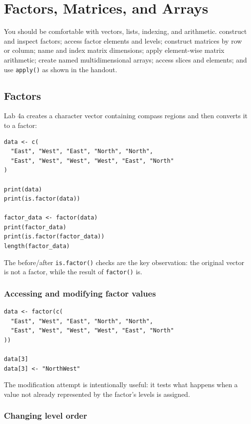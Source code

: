 \chapter{Factors, Matrices, and Arrays}
\label{chap:factors-matrices-arrays}

\chapterguide
  {You should be comfortable with vectors, lists, indexing, and arithmetic.}
  {construct and inspect factors; access factor elements and levels; construct matrices by row or column; name and index matrix dimensions; apply element-wise matrix arithmetic; create named multidimensional arrays; access slices and elements; and use \texttt{apply()} as shown in the handout.}

\section{Factors}

Lab 4a creates a character vector containing compass regions and then converts it to a factor:

\begin{lstlisting}[style=dsr]
data <- c(
  "East", "West", "East", "North", "North",
  "East", "West", "West", "West", "East", "North"
)

print(data)
print(is.factor(data))

factor_data <- factor(data)
print(factor_data)
print(is.factor(factor_data))
length(factor_data)
\end{lstlisting}

The before/after \texttt{is.factor()} checks are the key observation: the original vector is not a factor, while the result of \texttt{factor()} is.

\subsection{Accessing and modifying factor values}

\begin{lstlisting}[style=dsr]
data <- factor(c(
  "East", "West", "East", "North", "North",
  "East", "West", "West", "West", "East", "North"
))

data[3]
data[3] <- "NorthWest"
\end{lstlisting}

The modification attempt is intentionally useful: it tests what happens when a value not already represented by the factor's levels is assigned.

\subsection{Changing level order}

